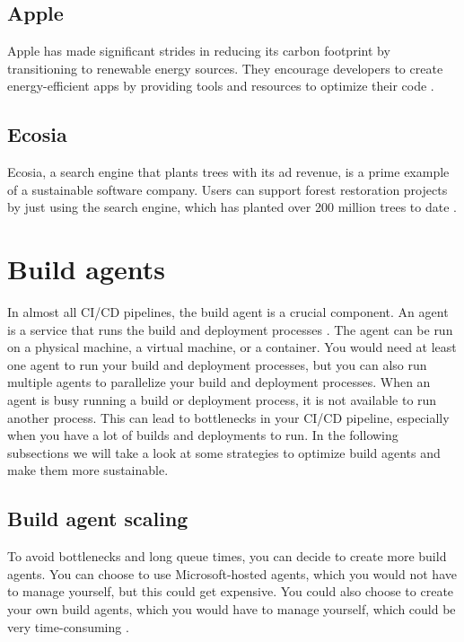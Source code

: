 \subsection{Apple}
Apple has made significant strides in reducing its carbon footprint by transitioning to renewable energy sources. 
They encourage developers to create energy-efficient apps by providing tools and resources to optimize their code \autocite{Corewave2023}.


\subsection{Ecosia}
Ecosia, a search engine that plants trees with its ad revenue, is a prime example of a sustainable software company. 
Users can support forest restoration projects by just using the search engine, which has planted over 200 million trees to date \autocite{Corewave2023}.



\section{Build agents}
In almost all CI/CD pipelines, the build agent is a crucial component. An agent is a service that runs the build and deployment processes \autocite{packt}.
The agent can be run on a physical machine, a virtual machine, or a container. 
You would need at least one agent to run your build and deployment processes, but you can also run multiple agents to parallelize your build and deployment processes.
When an agent is busy running a build or deployment process, it is not available to run another process.
This can lead to bottlenecks in your CI/CD pipeline, especially when you have a lot of builds and deployments to run.
In the following subsections we will take a look at some strategies to optimize build agents and make them more sustainable.


\subsection{Build agent scaling}
To avoid bottlenecks and long queue times, you can decide to create more build agents.
You can choose to use Microsoft-hosted agents, which you would not have to manage yourself, but this could get expensive.
You could also choose to create your own build agents, which you would have to manage yourself, which could be very time-consuming \autocite{Keiholz2023}.

